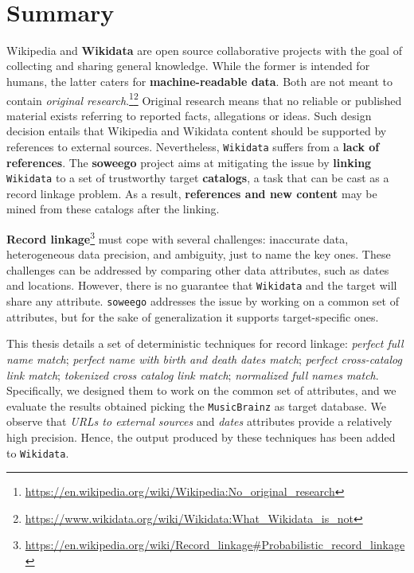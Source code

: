 \clearpage
\newpage
\mbox{~}
\clearpage
\newpage

\chapter*{Summary} %
\label{abstract}
Wikipedia and \textbf{Wikidata} are open source collaborative projects with the goal of collecting and sharing general knowledge. While the former is intended for humans, the latter caters for \textbf{machine-readable data}. Both are not meant to contain \textit{original research}.\footnote{\url{https://en.wikipedia.org/wiki/Wikipedia:No_original_research}}\footnote{\url{https://www.wikidata.org/wiki/Wikidata:What_Wikidata_is_not}} Original research means that no reliable or published material exists referring to reported facts, allegations or ideas.
Such design decision entails that Wikipedia and Wikidata content should be supported by references to external sources.
Nevertheless, \texttt{Wikidata} suffers from a \textbf{lack of references}.
The \textbf{soweego} project aims at mitigating the issue by \textbf{linking} \texttt{Wikidata} to a set of trustworthy target \textbf{catalogs}, a task that can be cast as a record linkage problem.
As a result, \textbf{references and new content} may be mined from these catalogs after the linking.

\textbf{Record linkage}\footnote{\url{https://en.wikipedia.org/wiki/Record_linkage\#Probabilistic_record_linkage}} must cope with several challenges: inaccurate data, heterogeneous data precision, and ambiguity, just to name the key ones.
These challenges can be addressed by comparing other data attributes, such as dates and locations. However, there is no guarantee that \texttt{Wikidata} and the target will share any attribute. \texttt{soweego} addresses the issue by working on a common set of attributes, but for the sake of generalization it supports target-specific ones.

This thesis details a set of deterministic techniques for record linkage: \textit{perfect full name match}; \textit{perfect name with birth and death dates match}; \textit{perfect cross-catalog link match}; \textit{tokenized cross catalog link match}; \textit{normalized full names match}.
Specifically, we designed them to work on the common set of attributes, and we evaluate the results obtained picking the \texttt{MusicBrainz} as target database.
We observe that \textit{URLs to external sources} and \textit{dates} attributes provide a relatively high precision.
Hence, the output produced by these techniques has been added to \texttt{Wikidata}.

